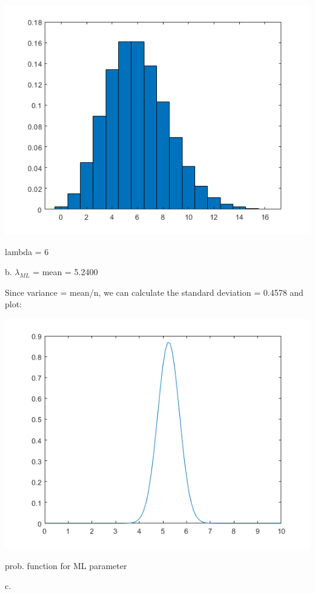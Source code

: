 \documentclass[a4paper]{article}
\begin{document}
\begin{center}
    \includegraphics[scale=1]{2a-2.png}
    \caption{lambda = 6}
\end{center}

\noindent
b. 
$\lambda_{ML}$ = mean = 5.2400

\noindent
Since variance = mean/n, we can calculate the standard deviation = 0.4578 and plot:

\begin{center}
    \includegraphics[scale=1]{2b.png}
    \caption{prob. function for ML parameter}
\end{center}

c. 
\end{document}
